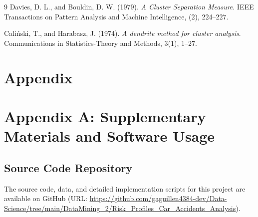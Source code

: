 \documentclass[conference]{IEEEtran}
\begin{document}
\begin{thebibliography}{9}
Davies, D. L., and Bouldin, D. W. (1979). 
\textit{A Cluster Separation Measure}. 
IEEE Transactions on Pattern Analysis and Machine Intelligence, (2), 224–227.

Caliński, T., and Harabasz, J. (1974). 
\textit{A dendrite method for cluster analysis}. 
Communications in Statistics-Theory and Methods, 3(1), 1–27.

\section*{\textbf{Appendix}}

\section*{Appendix A: Supplementary Materials and Software Usage}
\subsection*{Source Code Repository \label{app:code}}
The source code, data, and detailed implementation scripts for this project are available on GitHub (URL: \url{https://github.com/gaguillen4384-dev/Data-Science/tree/main/DataMining_2/Risk_Profiles_Car_Accidents_Analysis}).


\end{thebibliography}
\end{document}
